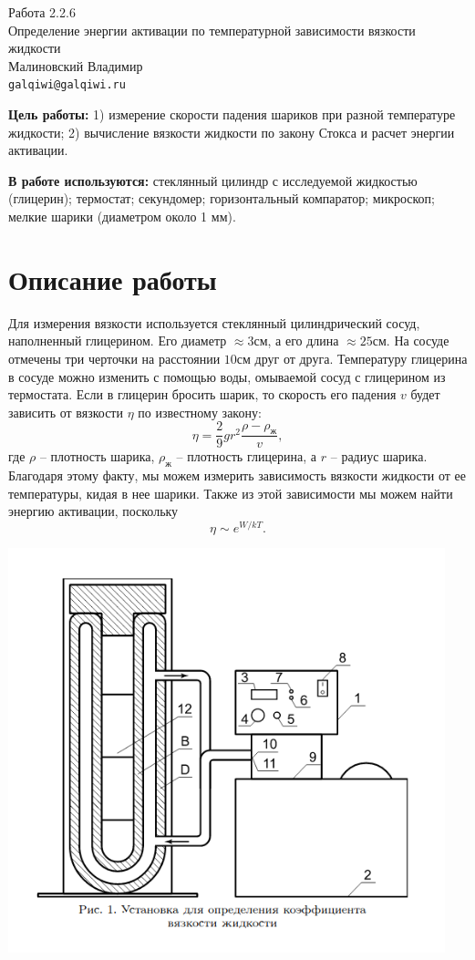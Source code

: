 
\usepackage{booktabs}
\usepackage{multirow}



\begin{center}
  \LARGE{Работа 2.2.6}\\[0.2cm]
  \LARGE{Определение энергии активации по температурной зависимости вязкости жидкости}\\[0.2cm]
  \large{Малиновский Владимир}\\[0.2cm]
  \normalsize{\texttt{galqiwi@galqiwi.ru}}
\end{center}

\textbf{Цель работы:} 1) измерение скорости падения шариков при разной температуре жидкости; 2) вычисление вязкости жидкости по закону Стокса и расчет энергии активации.

\textbf{В работе используются:} стеклянный цилиндр с исследуемой жидкостью (глицерин); термостат; секундомер; горизонтальный компаратор; микроскоп; мелкие шарики (диаметром около 1 мм).

\section*{Описание работы}
Для измерения вязкости используется стеклянный цилиндрический сосуд, наполненный глицерином. Его диаметр $\approx 3\text{см}$, а его длина $\approx25\text{см}$. На сосуде отмечены три черточки на расстоянии $10\text{см}$ друг от друга. Температуру глицерина в сосуде можно изменить с помощью воды, омываемой сосуд с глицерином из термостата. Если в глицерин бросить шарик, то скорость его падения $v$ будет зависить от вязкости $\eta$ по известному закону:
$$\eta=\frac{2}{9}gr^2\frac{\rho-\rho_\text{ж}}{v},$$
где $\rho$ -- плотность шарика, $\rho_\text{ж}$ -- плотность глицерина, а $r$ -- радиус шарика.\\
Благодаря этому факту, мы можем измерить зависимость вязкости жидкости от ее температуры, кидая в нее шарики. Также из этой зависимости мы можем найти энергию активации, поскольку
$$\eta \sim e^{W/kT}.$$
\begin{center}
\includegraphics[width=0.95\textwidth]{equip.png}
\end{center}

